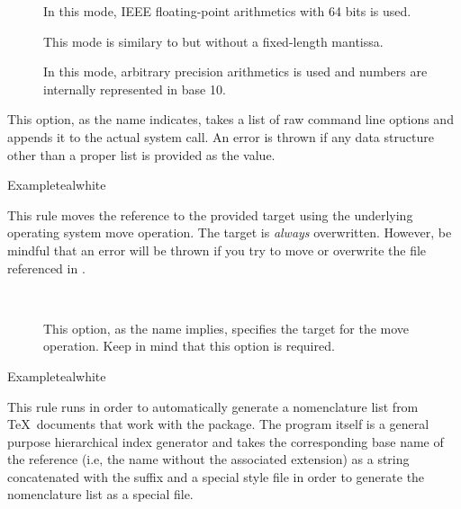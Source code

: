 \begin{description}
\begin{description}
\begin{description}
\item[] In this mode, IEEE floating-point arithmetics with 64 bits is used.
\item[] This mode is similary to  but without a fixed-length mantissa.
\item[] In this mode, arbitrary precision arithmetics is used and numbers are internally represented in base 10.
\end{description}

\item[\abox{options}] This option, as the name indicates, takes a list of raw command line options and appends it to the actual system call. An error is thrown if any data structure other than a proper list is provided as the value.
\end{description}

\begin{codebox}{Example}{teal}{\icnote}{white}
\end{codebox}

\item[\rulebox{move}]
This rule moves the  reference to the provided target using the underlying operating system move operation. The target is \emph{always} overwritten. However, be mindful that an error will be thrown if you try to move or overwrite the file referenced in .

\begin{description}
\item[~\rqbox] This option, as the name implies, specifies the target for the move operation. Keep in mind that this option is required.
\end{description}

\begin{codebox}{Example}{teal}{\icnote}{white}
\end{codebox}

\item[\rulebox{nomencl}]
This rule runs  in order to automatically generate a nomenclature list from \TeX\ documents that work with the  package. The program itself is a general purpose hierarchical index generator and takes the corresponding base name of the  reference (i.e, the name without the associated extension) as a string concatenated with the  suffix and a special style file in order to generate the nomenclature list as a special  file.


\end{description}
